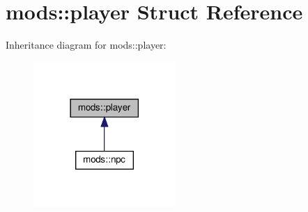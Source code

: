 \hypertarget{classmods_1_1player}{}\section{mods\+:\+:player Struct Reference}
\label{classmods_1_1player}


Inheritance diagram for mods\+:\+:player\+:\nopagebreak
\begin{figure}[H]
\begin{center}
\leavevmode
\includegraphics[width=153pt]{classmods_1_1player__inherit__graph}
\end{center}
\end{figure}
